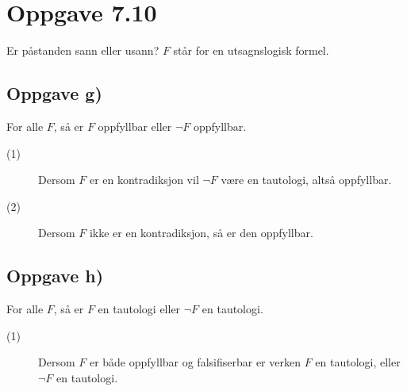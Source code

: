 \documentclass[norsk, 12p]{article}
\begin{document}
\section{Oppgave 7.10}
Er påstanden sann eller usann? $F$ står for en utsagnslogisk formel.

\subsection{Oppgave g)}
For alle $F$, så er $F$ oppfyllbar eller $\neg F$ oppfyllbar.
\begin{description}
\item[(1)] Dersom $F$ er en kontradiksjon vil $\neg F$ være en tautologi, altså oppfyllbar.
\item[(2)] Dersom $F$ ikke er en kontradiksjon, så er den oppfyllbar.
\end{description}

\subsection{Oppgave h)}
For alle $F$, så er $F$ en tautologi eller $\neg F$ en tautologi.
\begin{description}
\item[(1)] Dersom $F$ er både oppfyllbar og falsifiserbar er verken $F$ en tautologi, eller $\neg F$ en tautologi.
\end{description}
\end{document}
